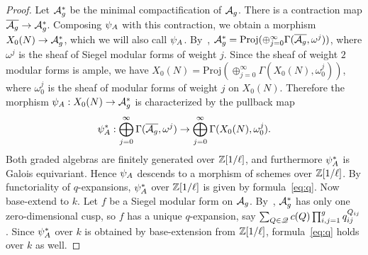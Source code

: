 \documentclass{amsart}
\begin{document}
\begin{proof}
    Let ${\mathcal{A}_{g}^\ast}$ be the minimal compactification of $\mathcal{A}_g$. There is a contraction map $\overline{\mathcal{A}_g} \to {\mathcal{A}_{g}^\ast}$. Composing $\psi_{A}$ with this contraction, we obtain a morphism $X_0(N) \to {\mathcal{A}_{g}^\ast}$, which we will also call $\psi_{A}$. By~\cite[Theorem V.2.3]{faltings1990degeneration}, ${\mathcal{A}_{g}^\ast} = \textrm{Proj}(\oplus_{j=0}^\infty \Gamma(\overline{\mathcal{A}_g}, \omega^j))$, where $\omega^j$ is the sheaf of Siegel modular forms of weight $j$. Since %
    the sheaf of weight $2$ modular forms is ample, we have $X_0(N) = \textrm{Proj}(\oplus_{j=0}^\infty \Gamma(X_0(N), \omega_0^j))$, where $\omega_0^j$ is the sheaf of modular forms of weight $j$ on $X_0(N)$. Therefore the morphism $\psi_{A}: X_0(N) \to {\mathcal{A}_{g}^\ast}$ is characterized by the pullback map
    \[
      \psi_{A}^*: \bigoplus_{j=0}^\infty \Gamma(\overline{\mathcal{A}_g}, \omega^j) \to \bigoplus_{j=0}^\infty \Gamma(X_0(N), \omega_0^j).
    \]
    Both graded algebras are finitely generated over $\mathbb{Z}[1/\ell]$, and furthermore $\psi_{A}^\ast$ is Galois equivariant. Hence $\psi_{A}$ descends to a morphism of schemes over $\mathbb{Z}[1/\ell]$. By functoriality of $q$-expansions, $\psi_{A}^*$ over $\mathbb{Z}[1/\ell]$ is given by formula~\eqref{eq:q}. Now base-extend to $k$. Let $f$ be a Siegel modular form on $\mathcal{A}_g$. By~\cite[Theorem V.2.3]{faltings1990degeneration}, ${\mathcal{A}_{g}^\ast}$ has only one zero-dimensional cusp, so $f$ has a unique $q$-expansion, say $\sum_{Q \in \mathscr{Q}} c(Q) \prod_{i,j=1}^g q_{ij}^{Q_{ij}}$. Since $\psi_{A}^*$ over $k$ is obtained by base-extension from $\mathbb{Z}[1/\ell]$, formula~\eqref{eq:q} holds over $k$ as well.

\end{proof}
\end{document}
